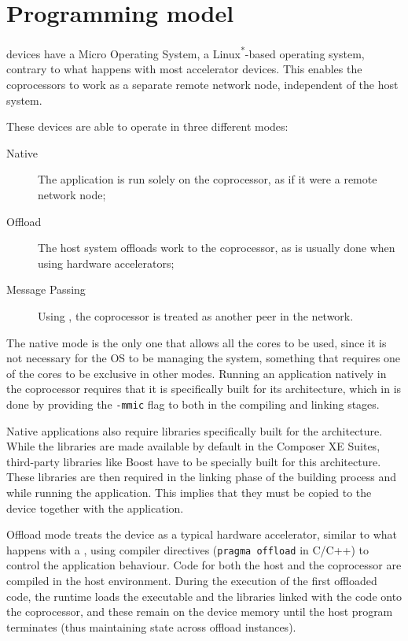 \documentclass[../thesis]{subfiles}
\begin{document}
	\section{Programming model}
	\label{sec:mic:programming}

	\intel\mic devices \cite{Intel:MIC:QuickStartGuide} have a Micro Operating System, a Linux\textsuperscript{*}-based operating system, contrary to what happens with most accelerator devices. This enables the coprocessors to work as a separate remote network node, independent of the host system.

	These devices are able to operate in three different modes:
		\begin{description}
			\item [Native] The application is run solely on the coprocessor, as if it were a remote network node;
			\item [Offload] The host system offloads work to the coprocessor, as is usually done when using hardware accelerators;
			\item [Message Passing] Using \mpi, the coprocessor is treated as another peer in the network.
		\end{description}

	The native mode is the only one that allows all the cores to be used, since it is not necessary for the OS to be managing the system, something that requires one of the cores to be exclusive in other modes. Running an application natively in the coprocessor requires that it is specifically built for its architecture, which in \icpc is done by providing the \texttt{-mmic} flag to both in the compiling and linking stages.

	Native applications also require libraries specifically built for the \intel\mic architecture. While the \intel libraries are made available by default in the \intel Composer XE Suites, third-party libraries like Boost have to be specially built for this architecture. These libraries are then required in the linking phase of the building process and while running the application. This implies that they must be copied to the device together with the application. 

	Offload mode treats the device as a typical hardware accelerator, similar to what happens with a \gpu, using compiler directives (\texttt{pragma offload} in C/C++) to control the application behaviour. Code for both the host and the coprocessor are compiled in the host environment. During the execution of the first offloaded code, the runtime loads the executable and the libraries linked with the code onto the coprocessor, and these remain on the device memory until the host program terminates (thus maintaining state across offload instances).
\end{document}

